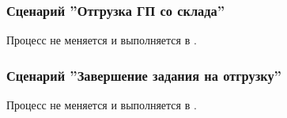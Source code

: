 

\subsubsection{Сценарий ''Отгрузка ГП со склада''}
\label{bp:goods_4}

Процесс не меняется и выполняется в \erp.




\subsubsection{Сценарий ''Завершение задания на отгрузку''}
\label{bp:goods_5}

Процесс не меняется и выполняется в \erp.








